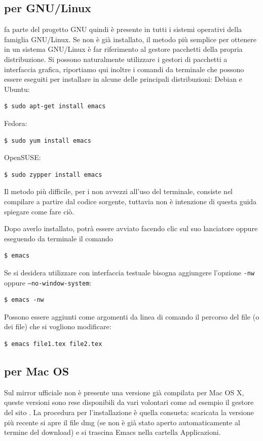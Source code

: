 \documentclass[11pt,a4paper]{article}
\begin{document}
\subsection{\emacs{} per GNU/Linux}
\label{sec:installlinux}


\emacs{} fa parte del progetto GNU quindi è presente in tutti i
sistemi operativi della famiglia GNU/Linux. Se non è già installato,
il metodo più semplice per ottenere \emacs{} in un sistema GNU/Linux è
far riferimento al gestore pacchetti della propria distribuzione. Si
possono naturalmente utilizzare i gestori di pacchetti a interfaccia
grafica, riportiamo qui inoltre i comandi da terminale che possono
essere eseguiti per installare \emacs{} in alcune delle principali
distribuzioni: Debian e Ubuntu:
\begin{Verbatim}
$ sudo apt-get install emacs
\end{Verbatim}
Fedora:
\begin{Verbatim}
$ sudo yum install emacs
\end{Verbatim}
OpenSUSE:
\begin{Verbatim}
$ sudo zypper install emacs
\end{Verbatim}

Il metodo più difficile, per i non avvezzi all'uso del terminale,
consiste nel compilare \emacs{} a partire dal codice sorgente,
tuttavia non è intenzione di questa guida spiegare come fare ciò.

Dopo averlo installato, \emacs{} potrà essere avviato facendo clic sul
suo lanciatore oppure eseguendo da terminale il comando
\begin{Verbatim}
$ emacs
\end{Verbatim}
Se si desidera utilizzare \emacs{} con interfaccia testuale bisogna
aggiungere l'opzione \texttt{-nw} oppure \texttt{--no-window-system}:
\begin{Verbatim}
$ emacs -nw
\end{Verbatim}
Possono essere aggiunti come argomenti da linea di comando il percorso
del file (o dei file) che si vogliono modificare:
\begin{Verbatim}
$ emacs file1.tex file2.tex
\end{Verbatim}

\subsection{\emacs{} per Mac OS}

Sul mirror ufficiale %
 non
è presente una versione già compilata per Mac OS X, queste versioni
sono rese disponibili da vari volontari come ad esempio il gestore del
sito . La
procedura per l'installazione è quella consueta: scaricata la versione
più recente si apre il file dmg (se non è già stato aperto
automaticamente al termine del download) e si trascina Emacs nella
cartella Applicazioni.
\end{document}
